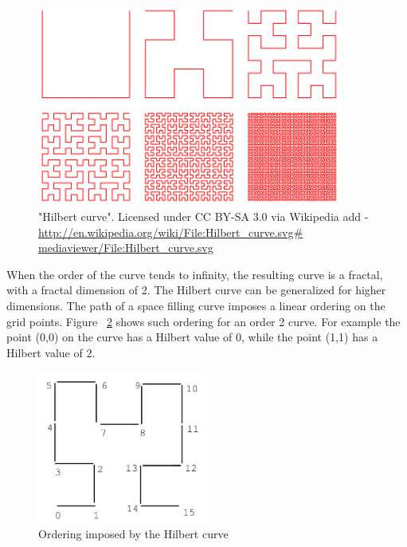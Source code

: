 \documentclass[11pt, a4paper, oneside]{article}
\begin{document}
\begin{figure}[h!]
  \centering
    \includegraphics[width=0.9\textwidth]{img/Hilbert6}
    \caption{"Hilbert curve". Licensed under CC BY-SA 3.0 via Wikipedia add -  \protect\url{http://en.wikipedia.org/wiki/File:Hilbert_curve.svg\# mediaviewer/File:Hilbert_curve.svg}}
  \label{fig:hilbert}
\end{figure}


When the order of the curve tends to infinity, the resulting curve is a fractal, with a fractal dimension of 2. The Hilbert curve can be generalized for higher dimensions. The path of a space filling curve imposes a linear ordering on the grid points. Figure ~\ref{fig:hilbert-ordering} shows such ordering for an order 2 curve. For example the point (0,0) on the curve has a Hilbert value of 0, while the point (1,1) has a Hilbert value of 2. 

\begin{figure}[h!]
  \centering
    \includegraphics[width=0.5\textwidth]{img/HilbertOrdering}
    \caption{Ordering imposed by the Hilbert curve {\cite{Kamel:1994:HRI:645920.673001}} }
  \label{fig:hilbert-ordering}
\end{figure}

\end{document}
